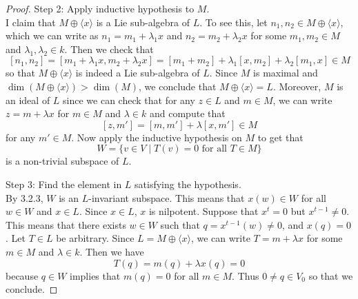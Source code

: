 \documentclass[a4paper]{article}
\begin{document}
\begin{prp}{}{}
\begin{proof}
Step 2: Apply inductive hypothesis to $M$. \\
I claim that $M\oplus\langle x\rangle$ is a Lie sub-algebra of $L$. To see this, let $n_1,n_2\in M\oplus\langle x\rangle$, which we can write as $n_1=m_1+\lambda_1x$ and $n_2=m_2+\lambda_2x$ for some $m_1,m_2\in M$ and $\lambda_1,\lambda_2\in k$. Then we check that $$[n_1,n_2]=[m_1+\lambda_1x,m_2+\lambda_2x]=[m_1+m_2]+\lambda_1[x,m_2]+\lambda_2[m_1,x]\in M$$ so that $M\oplus\langle x\rangle$ is indeed a Lie sub-algebra of $L$. Since $M$ is maximal and $\dim(M\oplus\langle x\rangle)>\dim(M)$, we conclude that $M\oplus\langle x\rangle=L$. Moreover, $M$ is an ideal of $L$ since we can check that for any $z\in L$ and $m\in M$, we can write $z=m+\lambda x$ for $m\in M$ and $\lambda\in k$ and compute that $$[z,m']=[m,m']+\lambda[x,m']\in M$$ for any $m'\in M$. Now apply the inductive hypothesis on $M$ to get that $$W=\{v\in V\;|\;T(v)=0\text{ for all }T\in M\}$$ is a non-trivial subspace of $L$. 

Step 3: Find the element in $L$ satisfying the hypothesis. \\
By 3.2.3, $W$ is an $L$-invariant subspace. This means that $x(w)\in W$ for all $w\in W$ and $x\in L$. Since $x\in L$, $x$ is nilpotent. Suppose that $x^t=0$ but $x^{t-1}\neq 0$. This means that there exists $w\in W$ such that $q=x^{t-1}(w)\neq 0$, and $x(q)=0$. Let $T\in L$ be arbitrary. Since $L=M\oplus\langle x\rangle$, we can write $T=m+\lambda x$ for some $m\in M$ and $\lambda\in k$. Then we have $$T(q)=m(q)+\lambda x(q)=0$$ because $q\in W$ implies that $m(q)=0$ for all $m\in M$. Thus $0\neq q\in V_0$ so that we conclude. 
\end{proof}
\end{prp}
\end{document}

